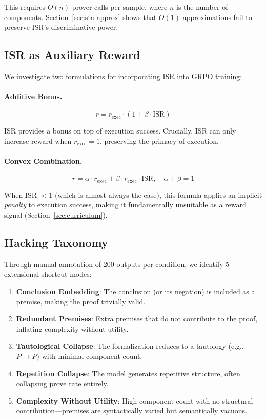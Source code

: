 \documentclass[11pt,a4paper]{article}
\begin{document}
This requires $O(n)$ prover calls per sample, where $n$ is the number of components.
Section~\ref{sec:sta-approx} shows that $O(1)$ approximations fail to preserve ISR's discriminative power.

\subsection{ISR as Auxiliary Reward}

We investigate two formulations for incorporating ISR into GRPO training:

\paragraph{Additive Bonus.}
\begin{equation}
r = r_{\text{exec}} \cdot (1 + \beta \cdot \text{ISR})
\label{eq:additive}
\end{equation}

ISR provides a bonus on top of execution success. Crucially, ISR can only increase reward when $r_{\text{exec}} = 1$, preserving the primacy of execution.

\paragraph{Convex Combination.}
\begin{equation}
r = \alpha \cdot r_{\text{exec}} + \beta \cdot r_{\text{exec}} \cdot \text{ISR}, \quad \alpha + \beta = 1
\label{eq:convex}
\end{equation}

When ISR $< 1$ (which is almost always the case), this formula applies an implicit \emph{penalty} to execution success, making it fundamentally unsuitable as a reward signal (Section~\ref{sec:curriculum}).

\subsection{Hacking Taxonomy}

Through manual annotation of 200 outputs per condition, we identify 5 extensional shortcut modes:

\begin{enumerate}
\item \textbf{Conclusion Embedding}: The conclusion (or its negation) is included as a premise, making the proof trivially valid.
\item \textbf{Redundant Premises}: Extra premises that do not contribute to the proof, inflating complexity without utility.
\item \textbf{Tautological Collapse}: The formalization reduces to a tautology (e.g., $P \rightarrow P$) with minimal component count.
\item \textbf{Repetition Collapse}: The model generates repetitive structure, often collapsing prove rate entirely.
\item \textbf{Complexity Without Utility}: High component count with no structural contribution---premises are syntactically varied but semantically vacuous.
\end{enumerate}
\end{document}

